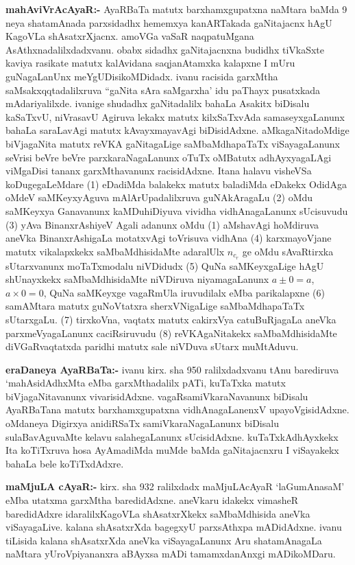 \textbf{mahAviVrAcAyaR:-} AyaRBaTa matutx barxhamxgupatxna naMtara baMda {\rm 9} neya shatamAnada parxsidadhx hememxya kanARTakada gaNitajacnx hAgU KagoVLa shAsatxrXjacnx. amoVGa vaSaR naqpatuMgana AsAthxnadalilxdadxvanu. obabx sidadhx gaNitajacnxna budidhx tiVkaSxte kaviya rasikate matutx kalAvidana saqjanAtamxka kalapxne I mUru guNagaLanUnx meYgUDisi\break koMDidadx. ivanu racisida garxMtha saMsakxqqtadalilxruva ``gaNita sAra saMgarxha' idu paThayx pusatxkada mAdariyalilxde. ivanige shudadhx gaNitadalilx bahaLa Asakitx biDisalu kaSaTxvU, niVrasavU Agiruva lekakx matutx kilxSaTxvAda samaseyxgaLanunx bahaLa saraLavAgi matutx kAvayxmayavAgi biDisidAdxne. aMkagaNitadoMdige biVjagaNita matutx reVKA gaNitagaLige saMbaMdhapaTaTx viSayagaLanunx seVrisi beVre beVre parxkaraNagaLanunx oTuTx oMBatutx adhAyxya\-gaLAgi viMgaDisi tananx garxMthavanunx racisidAdxne. Itana halavu visheVSa koDugegaLeMdare {\rm (1)} eDadiMda balakekx matutx baladiMda eDakekx OdidAga oMdeV saMKeyxyAguva mAlA\-rUpadalilxruva guNAkAragaLu {\rm (2)} oMdu saMKeyxya Ganavanunx kaMDuhiDiyuva vividha vidhAnagaLanunx sUcisuvudu {\rm (3)} yAva BinanxrAshiyeV Agali adanunx oMdu {\rm (1)} aMshavAgi hoMdiruva aneVka BinanxrAshigaLa motatxvAgi toVrisuva vidhAna {\rm (4)} karxmayoVjane matutx vikalapxkekx saMbaMdhisidaMte adaralUlx $n_{c_{r}}$ ge oMdu sAvaRtirxka sUtarxvanunx moTaTxmodalu niVDidudx {\rm (5)} QuNa saMKeyxgaLige hAgU shUnayxkekx saMbaMdhisi\-daMte niVDiruva niyamagaLanunx 
$a \pm 0 = a$, $a \times 0 = 0$, QuNa saMKeyxge vagaRmUla iruvudilalx eMba parikalapxne {\rm (6)} samAMtara matutx guNoVtatxra sherxVNigaLige saMbaMdhapaTaTx sUtarxgaLu. {\rm (7)} tirxkoVna, vaqtatx matutx cakirxVya catuBuRjagaLa aneVka parxmeVyagaLanunx caciRsiruvudu {\rm (8)} reVKAgaNitakekx saMbaMdhisidaMte diVGaRvaqtatxda paridhi matutx sale niVDuva sUtarx muMtAduvu.

\textbf{eraDaneya AyaRBaTa:-} ivanu kirx. sha {\rm 950} ralilxdadxvanu tAnu barediruva `mahAsidAdhxMta eMba garxMthadalilx pATi, kuTaTxka matutx biVjagaNitavanunx vivarisidAdxne. vagaRsamiVkaraNavanunx biDisalu AyaRBaTana matutx barxhamxgupatxna vidhAnagaLanenxV upayoVgisidAdxne. oMdaneya Digirxya anidiRSaTx samiVkaraNagaLanunx biDisalu sulaBavAguvaMte kelavu salahegaLanunx sUcisidAdxne. kuTaTxkAdhAyxkekx Ita koTiTxruva hosa AyAmadiMda muMde baMda gaNitajacnxru I viSayakekx bahaLa bele koTiTxdAdxre.

\textbf{maMjuLA cAyaR:-} kirx. sha {\rm 932} ralilxdadx maMjuLAcAyaR `laGumAnasaM' eMba utatxma garxMtha baredidAdxne. aneVkaru idakekx vimasheR baredidAdxre idaralilx\break KagoVLa shAsatxrXkekx saMbaMdhisida aneVka viSayagaLive. kalana shAsatxrXda bagegxyU parxsAthxpa mADidAdxne. ivanu tiLisida kalana shAsatxrXda aneVka viSayagaLanunx Aru shatamAnagaLa naMtara yUroVpiyananxra aBAyxsa mADi tamamxdanAnxgi mADikoMDaru. 

